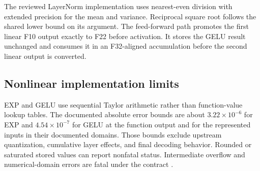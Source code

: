 The reviewed LayerNorm implementation uses nearest-even division with extended precision for the mean and variance. Reciprocal square root follows the shared lower bound on its argument. The feed-forward path promotes the first linear F10 output exactly to F22 before activation. It stores the GELU result unchanged and consumes it in an F32-aligned accumulation before the second linear output is converted.

\subsection{Nonlinear implementation limits}
EXP and GELU use sequential Taylor arithmetic rather than function-value lookup tables. The documented absolute error bounds are about \(3.22\times10^{-6}\) for EXP and \(4.54\times10^{-7}\) for GELU at the function output and for the represented inputs in their documented domains. Those bounds exclude upstream quantization, cumulative layer effects, and final decoding behavior. Rounded or saturated stored values can report nonfatal status. Intermediate overflow and numerical-domain errors are fatal under the contract \cite{rtlrepo}.
\clearpage
